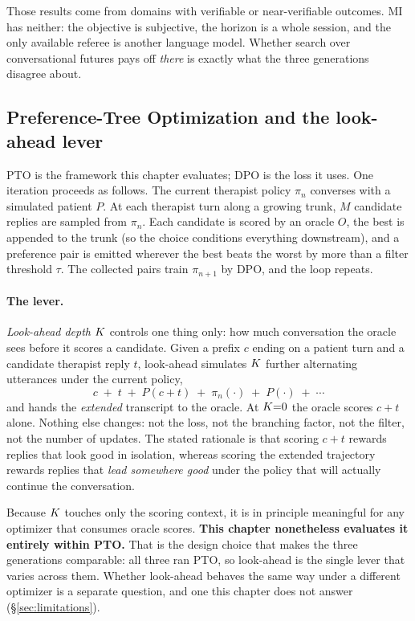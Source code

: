 Those results come from domains with verifiable or near-verifiable outcomes. MI has neither: the
objective is subjective, the horizon is a whole session, and the only available referee is
another language model. Whether search over conversational futures pays off \emph{there} is
exactly what the three generations disagree about.

\subsection{Preference-Tree Optimization and the look-ahead lever}
\label{sec:pto}
PTO \citep{baruch2025pto} is the framework this chapter evaluates; DPO is the loss it uses.
One iteration proceeds as follows. The current therapist policy $\pi_n$ converses with a
simulated patient $P$. At each therapist turn along a growing trunk, $M$ candidate replies are
sampled from $\pi_n$. Each candidate is scored by an oracle $O$, the best is appended to the
trunk (so the choice conditions everything downstream), and a preference pair is emitted
wherever the best beats the worst by more than a filter threshold $\tau$. The collected pairs
train $\pi_{n+1}$ by DPO, and the loop repeats.

\paragraph{The lever.}
\emph{Look-ahead depth} $K$ controls one thing only: how much conversation the oracle sees
before it scores a candidate. Given a prefix $c$ ending on a patient turn and a candidate
therapist reply $t$, look-ahead simulates $K$ further alternating utterances under the current
policy,
\[
c \;+\; t \;+\; P(c{+}t) \;+\; \pi_n(\cdot) \;+\; P(\cdot) \;+\; \cdots
\]
and hands the \emph{extended} transcript to the oracle. At $K{=}0$ the oracle scores $c{+}t$
alone. Nothing else changes: not the loss, not the branching factor, not the filter, not the
number of updates. The stated rationale is that scoring $c{+}t$ rewards replies that look good
in isolation, whereas scoring the extended trajectory rewards replies that \emph{lead
somewhere good} under the policy that will actually continue the conversation.

Because $K$ touches only the scoring context, it is in principle meaningful for any optimizer
that consumes oracle scores. \textbf{This chapter nonetheless evaluates it entirely within
PTO.} That is the design choice that makes the three generations comparable: all three ran PTO,
so look-ahead is the single lever that varies across them. Whether look-ahead behaves the same
way under a different optimizer is a separate question, and one this chapter does not answer
(\S\ref{sec:limitations}).

